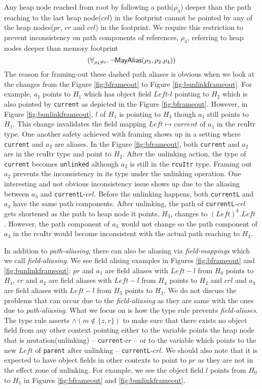 Any heap node reached from root by following a path($\rho_3$) deeper than the path reaching to the last heap node($crl$) in the footprint cannot be pointed by any of the heap nodes($pr$, $cr$ and $crl$) in the footprint. We require this restriction to prevent inconsistency on path components of references, $\rho_3$, referring to heap nodes deeper than memory footprint
\[
 (\forall_{\rho_4\neq \epsilon} \ldotp \neg\mathsf{MayAlias}(\rho_3, \rho_2.\rho_4) )
\]
The reason for framing-out these dashed path aliases is obvious when we look at the changes from the Figure \ref{fig:bframeout} to Figure \ref{fig:bunlinkframeout}. For example, $a_1$ points to $H_1$ which has object field $Left$-$l$ pointing to $H_2$ which is also pointed by \texttt{current} as depicted in the Figure \ref{fig:bframeout}. However, in Figure \ref{fig:bunlinkframeout}, $l$ of $H_1$ is pointing to $H_3$ though $a_1$ still points to $H_1$. This change invalidates the field mapping $Left \mapsto current$ of $a_1$ in the \textsf{rcuItr} type. One another safety achieved with framing shows up in a setting where \texttt{current} and $a_2$ are aliases. In the Figure \ref{fig:bframeout}, both \texttt{current} and $a_2$ are in the \textsf{rcuItr} type and point to $H_2$. After the unlinking action, the type of \texttt{current} becomes \texttt{unlinked} although $a_2$ is still in the \texttt{rcuItr} type. Framing out $a_2$ prevents the inconsistency in its type under the unlinking operation. One interesting and not obvious inconsistency issue shows up due to the aliasing between $a_3$ and \texttt{currentL}-$crl$. Before the unlinking happens, both \texttt{currentL} and $a_3$ have the same path components. After unlinking, the path of \texttt{currentL}-$crl$ gets shortened as the path to heap node it points, $H_3$, changes  to $(Left)^{k}.Left$ . However, the path component of $a_3$  would not change so the path component of $a_3$ in the \textsf{rcuItr} would become inconsistent with the actual path reaching to $H_3$.

In addition to \textit{path-aliasing}, there can also be aliasing via \textit{field-mappings} which we call \textit{field-aliasing}. We see field alising examples in Figures \ref{fig:bframeout} and \ref{fig:bunlinkframeout}: $pr$ and $a_1$ are field aliases with $Left-l$ from $H_0$ points to $H_1$, $cr$ and $a_2$ are field aliases with $Left-l$ from $H_4$ points to $H_2$  and $crl$ and $a_3$ are field aliases with $Left-l$ from $H_5$ points to $H_3$. We do not discuss the problems that can occur due to the \textit{field-aliasing} as they are same with the ones due to \textit{path-aliasing}. What we focus on is how the type rule prevents \textit{field-aliases}. The type rule asserts $ \land (m\not\in\{z,r\} )$ to make sure that there exists no object field from any other context pointing either to the variable points the heap node that is mutation(unlinking) -- \texttt{current}-$cr$ -- or to the variable which points to the new $Left$ of \texttt{parent} after unlinking -- \texttt{currentL}-$crl$. We should also note that it is expected to have object fields in other contexts to point to $pr$ as they are not in the effect zone of unlinking. For example, we see the object field $l$ points from $H_0$ to  $H_1$ in Figures \ref{fig:bframeout} and \ref{fig:bunlinkframeout}.

